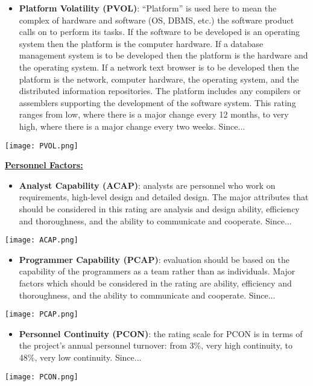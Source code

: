 \begin{itemize}
	\item \textbf{Platform Volatility (PVOL)}: ``Platform'' is used here to mean the complex of hardware and software (OS, DBMS, etc.) the software product calls on to perform its tasks. If the software to be developed is an operating system then the platform is the computer hardware. If a database management system is to be	developed then the platform is the hardware and the operating system. If a network text browser	is to be developed then the platform is the network, computer hardware, the operating system, and the distributed information repositories. The platform includes any compilers or assemblers	supporting the development of the software system. This rating ranges from low, where there is	a major change every 12 months, to very high, where there is a major change every two weeks. Since... \todo{}
\end{itemize}
\begin{center}
	\texttt{[image: PVOL.png]}
\end{center}

\textbf{\underline{Personnel Factors:}}

\begin{itemize}
	\item \textbf{Analyst Capability (ACAP)}: analysts are personnel who work on requirements, high-level design and detailed design.	The major attributes that should be considered in this rating are analysis and design ability,	efficiency and thoroughness, and the ability to communicate and cooperate.  Since... \todo{}
\end{itemize}
\begin{center}
	\texttt{[image: ACAP.png]}
\end{center}	

\begin{itemize}
	\item \textbf{Programmer Capability (PCAP)}: evaluation should be based on the capability of the programmers as a team rather than as individuals. Major factors which should be considered in the rating are ability, efficiency and thoroughness, and the ability to communicate and cooperate.  Since... \todo{}
\end{itemize}
\begin{center}
	\texttt{[image: PCAP.png]}
\end{center}	

\begin{itemize}
	\item \textbf{Personnel Continuity (PCON)}: the rating scale for PCON is in terms of the project’s annual personnel turnover: from 3\%, very high continuity, to 48\%, very low continuity.  Since... \todo{}
\end{itemize}
\begin{center}
	\texttt{[image: PCON.png]}
\end{center}


